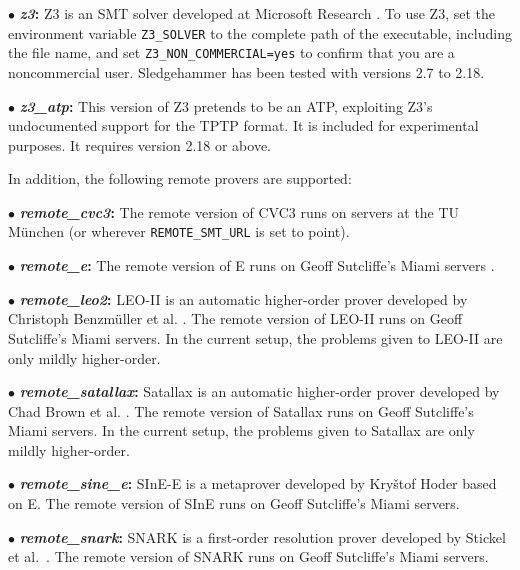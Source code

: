 \documentclass[a4paper,12pt]{article}
\begin{document}
\begin{enum}
\begin{enum}
\item[$\bullet$] \textbf{\textit{z3}:} Z3 is an SMT solver developed at
Microsoft Research \cite{z3}. To use Z3, set the environment variable
\texttt{Z3\_SOLVER} to the complete path of the executable, including the file
name, and set \texttt{Z3\_NON\_COMMERCIAL=yes} to confirm that you are a
noncommercial user. Sledgehammer has been tested with versions 2.7 to 2.18.

\item[$\bullet$] \textbf{\textit{z3\_atp}:} This version of Z3 pretends to be an
ATP, exploiting Z3's undocumented support for the TPTP format. It is included
for experimental purposes. It requires version 2.18 or above.
\end{enum}

In addition, the following remote provers are supported:

\begin{enum}
\item[$\bullet$] \textbf{\textit{remote\_cvc3}:} The remote version of CVC3 runs
on servers at the TU M\"unchen (or wherever \texttt{REMOTE\_SMT\_URL} is set to
point).

\item[$\bullet$] \textbf{\textit{remote\_e}:} The remote version of E runs
on Geoff Sutcliffe's Miami servers \cite{sutcliffe-2000}.

\item[$\bullet$] \textbf{\textit{remote\_leo2}:} LEO-II is an automatic
higher-order prover developed by Christoph Benzm\"uller et al. \cite{leo2}. The
remote version of LEO-II runs on Geoff Sutcliffe's Miami servers. In the current
setup, the problems given to LEO-II are only mildly higher-order.

\item[$\bullet$] \textbf{\textit{remote\_satallax}:} Satallax is an automatic
higher-order prover developed by Chad Brown et al. \cite{satallax}. The remote
version of Satallax runs on Geoff Sutcliffe's Miami servers. In the current
setup, the problems given to Satallax are only mildly higher-order.

\item[$\bullet$] \textbf{\textit{remote\_sine\_e}:} SInE-E is a metaprover
developed by Kry\v stof Hoder \cite{sine} based on E. The remote version of
SInE runs on Geoff Sutcliffe's Miami servers.

\item[$\bullet$] \textbf{\textit{remote\_snark}:} SNARK is a first-order
resolution prover developed by Stickel et al.\ \cite{snark}. The remote version
of SNARK runs on Geoff Sutcliffe's Miami servers.


\end{enum}
\end{enum}
\end{document}
